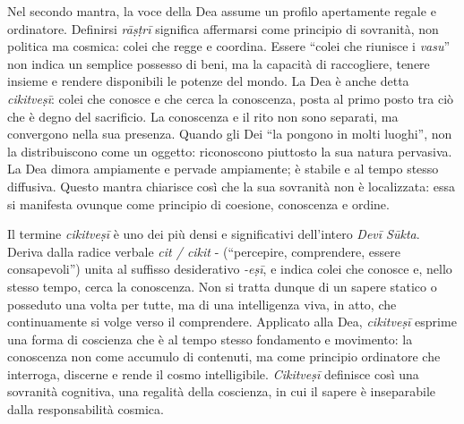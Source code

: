 Nel secondo mantra, la voce della Dea assume un profilo apertamente regale e ordinatore. Definirsi \textit{rāṣṭrī} significa affermarsi come principio di sovranità, non politica ma cosmica: colei che regge e coordina. Essere “colei che riunisce i \textit{vasu}” non indica un semplice possesso di beni, ma la capacità di raccogliere, tenere insieme e rendere disponibili le potenze del mondo. La Dea è anche detta \textit{cikitveṣī}: colei che conosce e che cerca la conoscenza, posta al primo posto tra ciò che è degno del sacrificio. La conoscenza e il rito non sono separati, ma convergono nella sua presenza. Quando gli Dei “la pongono in molti luoghi”, non la distribuiscono come un oggetto: riconoscono piuttosto la sua natura pervasiva. La Dea dimora ampiamente e pervade ampiamente; è stabile e al tempo stesso diffusiva. Questo mantra chiarisce così che la sua sovranità non è localizzata: essa si manifesta ovunque come principio di coesione, conoscenza e ordine.

Il termine \textit{cikitveṣī} è uno dei più densi e significativi dell’intero \textit{Devī Sūkta}. Deriva dalla radice verbale \textit{cit / cikit} - (“percepire, comprendere, essere consapevoli”) unita al suffisso desiderativo \textit{-eṣī}, e indica colei che conosce e, nello stesso tempo, cerca la conoscenza. Non si tratta dunque di un sapere statico o posseduto una volta per tutte, ma di una intelligenza viva, in atto, che continuamente si volge verso il comprendere. Applicato alla Dea, \textit{cikitveṣī} esprime una forma di coscienza che è al tempo stesso fondamento e movimento: la conoscenza non come accumulo di contenuti, ma come principio ordinatore che interroga, discerne e rende il cosmo intelligibile. \textit{Cikitveṣī} definisce così una sovranità cognitiva, una regalità della coscienza, in cui il sapere è inseparabile dalla responsabilità cosmica.
